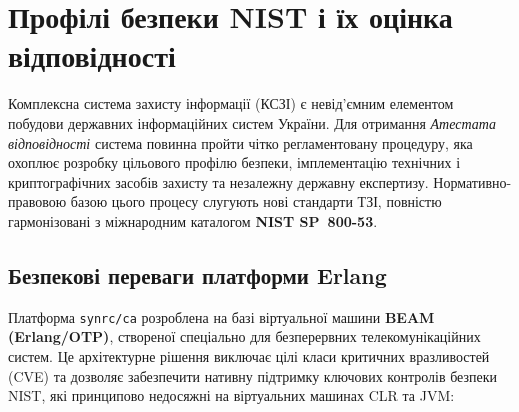 \chapter{Профілі безпеки NIST і їх оцінка відповідності}

Комплексна система захисту інформації (КСЗІ) є невід'ємним елементом побудови
державних інформаційних систем України. Для отримання \emph{Атестата відповідності}
система повинна пройти чітко регламентовану процедуру, яка охоплює розробку цільового
профілю безпеки, імплементацію технічних і криптографічних засобів захисту та
незалежну державну експертизу. Нормативно-правовою базою цього процесу слугують
нові стандарти ТЗІ, повністю гармонізовані з міжнародним каталогом \textbf{NIST SP~800-53}.

\section{Безпекові переваги платформи Erlang}

Платформа \texttt{synrc/ca} розроблена на базі віртуальної машини \textbf{BEAM (Erlang/OTP)},
створеної спеціально для безперервних телекомунікаційних систем. Це архітектурне рішення
виключає цілі класи критичних вразливостей (CVE) та дозволяє забезпечити нативну підтримку
ключових контролів безпеки NIST, які принципово недосяжні на віртуальних машинах CLR та JVM:

